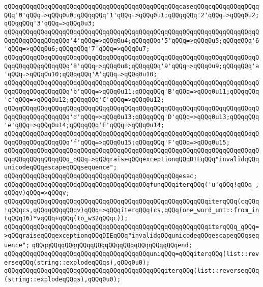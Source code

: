 \verb|qQQqqQQqqQQqqQQqqQQqqQQqqQQqqQQqqQQqqQQqqQQqqQQqcaseqQQqcqQQqqQQqqQQqqQQq'0'qQQq=>qQQq0u0;qQQqqQQq'1'qQQq=>qQQq0u1;qQQqqQQq'2'qQQq=>qQQq0u2;qQQqqQQq'3'qQQq=>qQQq0u3;|\newline
\verb|qQQqqQQqqQQqqQQqqQQqqQQqqQQqqQQqqQQqqQQqqQQqqQQqqQQqqQQqqQQqqQQqqQQqqQQqqQQqqQQqqQQqqQQq'4'qQQq=>qQQq0u4;qQQqqQQq'5'qQQq=>qQQq0u5;qQQqqQQq'6'qQQq=>qQQq0u6;qQQqqQQq'7'qQQq=>qQQq0u7;|\newline
\verb|qQQqqQQqqQQqqQQqqQQqqQQqqQQqqQQqqQQqqQQqqQQqqQQqqQQqqQQqqQQqqQQqqQQqqQQqqQQqqQQqqQQqqQQq'8'qQQq=>qQQq0u8;qQQqqQQq'9'qQQq=>qQQq0u9;qQQqqQQq'a'qQQq=>qQQq0u10;qQQqqQQq'A'qQQq=>qQQq0u10;|\newline
\verb|qQQqqQQqqQQqqQQqqQQqqQQqqQQqqQQqqQQqqQQqqQQqqQQqqQQqqQQqqQQqqQQqqQQqqQQqqQQqqQQqqQQqqQQq'b'qQQq=>qQQq0u11;qQQqqQQq'B'qQQq=>qQQq0u11;qQQqqQQq'c'qQQq=>qQQq0u12;qQQqqQQq'C'qQQq=>qQQq0u12;|\newline
\verb|qQQqqQQqqQQqqQQqqQQqqQQqqQQqqQQqqQQqqQQqqQQqqQQqqQQqqQQqqQQqqQQqqQQqqQQqqQQqqQQqqQQqqQQq'd'qQQq=>qQQq0u13;qQQqqQQq'D'qQQq=>qQQq0u13;qQQqqQQq'e'qQQq=>qQQq0u14;qQQqqQQq'E'qQQq=>qQQq0u14;|\newline
\verb|qQQqqQQqqQQqqQQqqQQqqQQqqQQqqQQqqQQqqQQqqQQqqQQqqQQqqQQqqQQqqQQqqQQqqQQqqQQqqQQqqQQqqQQq'f'qQQq=>qQQq0u15;qQQqqQQq'F'qQQq=>qQQq0u15;|\newline
\verb|qQQqqQQqqQQqqQQqqQQqqQQqqQQqqQQqqQQqqQQqqQQqqQQqqQQqqQQqqQQqqQQqqQQqqQQqqQQqqQQqqQQqqQQq_qQQq=>qQQqraiseqQQqexceptionqQQqDIEqQQq"invalidqQQqunicodeqQQqescapeqQQqsequence";|\newline
\verb|qQQqqQQqqQQqqQQqqQQqqQQqqQQqqQQqqQQqqQQqqQQqqQQqesac;|\newline
\verb|qQQqqQQqqQQqqQQqqQQqqQQqqQQqqQQqqQQqqQQqfunqQQqiterqQQq('u'qQQq!qQQq_,qQQqv)qQQq=>qQQqv;|\newline
\verb|qQQqqQQqqQQqqQQqqQQqqQQqqQQqqQQqqQQqqQQqqQQqqQQqqQQqqQQqiterqQQq(cqQQq!qQQqcs,qQQqqQQqqQQqv)qQQq=>qQQqiterqQQq(cs,qQQq(one_word_unt::from_intqQQq16)*vqQQq+qQQq(to_w32qQQqc));|\newline
\verb|qQQqqQQqqQQqqQQqqQQqqQQqqQQqqQQqqQQqqQQqqQQqqQQqqQQqqQQqiterqQQq_qQQq=>qQQqraiseqQQqexceptionqQQqDIEqQQq"invalidqQQqunicodeqQQqescapeqQQqsequence";|\newline
\verb|qQQqqQQqqQQqqQQqqQQqqQQqqQQqqQQqqQQqqQQqend;|\newline
\verb|qQQqqQQqqQQqqQQqqQQqqQQqqQQqqQQqqQQqqQQquniqQQq=qQQqiterqQQq(list::reverseqQQq(string::explodeqQQqs),qQQq0u0);|\newline
\verb|qQQqqQQqqQQqqQQqqQQqqQQqqQQqqQQqqQQqqQQqqQQqiterqQQq(list::reverseqQQq(string::explodeqQQqs),qQQq0u0);|\newline
